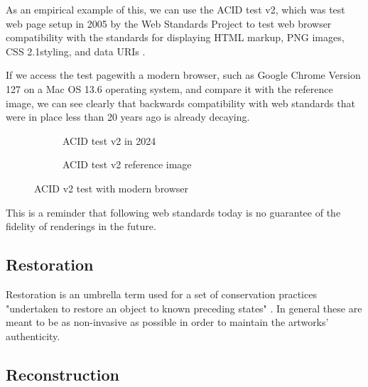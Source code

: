 As an empirical example of this, we can use the ACID test v2, which was test web page setup in 2005 by the Web Standards Project to test web browser compatibility with the standards for displaying HTML markup, PNG images, CSS 2.1styling, and data URIs \cite{Acid22024}.

If we access the test page\footnotemark[5] with a modern browser, such as Google Chrome Version 127 on a Mac OS 13.6 operating system, and compare it with the reference image\footnotemark[6], we can see clearly that backwards compatibility with web standards that were in place less than 20 years ago is already decaying.


\begin{figure}[h]
  \centering
  \begingroup
  \setlength{\fboxsep}{0pt} %
  \setlength{\fboxrule}{1pt} %
  \begin{subfigure}[b]{0.45\textwidth}
    \centering
    \caption{ACID test v2 in 2024}
    \label{fig:acid1}
  \end{subfigure}
  \hfill
  \begin{subfigure}[b]{0.45\textwidth}
    \centering
    \caption{ACID test v2 reference image}
    \label{fig:acid2}
  \end{subfigure}
  \endgroup
  \caption{ACID v2 test with modern browser}
  \label{fig:acid2-test}
\end{figure}


This is a reminder that following web standards today is no guarantee of the fidelity of renderings in the future. 

\subsection{Restoration}

Restoration is an umbrella term used for a set of conservation practices "undertaken to restore an object to known preceding states" \cite{dekkerCollectingConservingNet2018}. In general these are meant to be as non-invasive as possible in order to maintain the artworks' authenticity. 

\subsection{Reconstruction}

